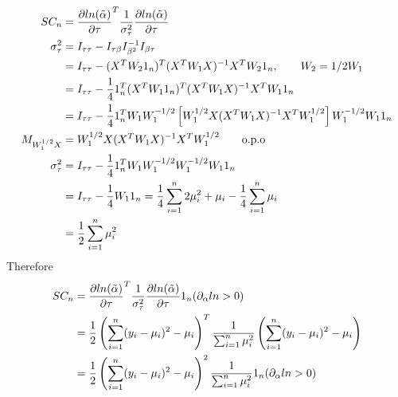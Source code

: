 \documentclass[11pt]{article} %
\begin{document}
\begin{align*}
	SC_n &= \frac{\partial ln(\Tilde{\alpha})}{\partial \tau}^T \frac{1}{\sigma_{\tau}^2} \frac{\partial ln(\Tilde{\alpha})}{\partial \tau}\\
	\sigma_{\tau}^2 &= I_{\tau \tau} - I_{\tau \beta} I_{\beta^2}^{-1} I_{\beta \tau} \\
	&= I_{\tau\tau} - (X^T W_2 1_n)^T (X^T W_1 X)^{-1} X^T W_2 1_n , \qquad W_2 = 1/2 W_1\\
	&= I_{\tau\tau} - \frac{1}{4} 1_n^T (X^T W_1 1_n)^T (X^T W_1 X)^{-1} X^T W_1 1_n \\
	&=I_{\tau\tau} -\frac{1}{4}  1_n^T W_1 W_1^{-1/2} \left[ W_1^{1/2} X (X^T W_1 X)^{-1} X^T W_1^{1/2}\right] W_1^{-1/2} W_1 1_n \\
	M_{ W_1^{1/2} X} &= W_1^{1/2} X (X^T W_1 X)^{-1} X^T W_1^{1/2} \qquad \text{o.p.o}\\
	\sigma_{\tau}^2 &= I_{\tau\tau} -\frac{1}{4} 1_n^T W_1 W_1^{-1/2}  W_1^{-1/2} W_1 1_n \\
	&= I_{\tau\tau} -\frac{1}{4} W_1 1_n = \frac{1}{4} \sum_{i=1}^n 2 \mu_i^2 + \mu_i - \frac{1}{4} \sum_{i=1}^n \mu_i \\
	&= \frac{1}{2} \sum_{i=1}^n \mu_i^2
\end{align*}
Therefore
\begin{align*}
	SC_n &= \frac{\partial ln(\Tilde{\alpha})}{\partial \tau}^T \frac{1}{\sigma_{\tau}^2} \frac{\partial ln(\Tilde{\alpha})}{\partial \tau} 1_n(\partial_{\alpha} ln > 0)\\
	&= \frac{1}{2} \left(\sum_{i=1}^n (y_i-\mu_i)^2- \mu_i \right)^T \frac{1}{\sum_{i=1}^n \mu_i^2} \left(\sum_{i=1}^n (y_i-\mu_i)^2- \mu_i \right) \\
	&= \frac{1}{2} \left(\sum_{i=1}^n (y_i-\mu_i)^2- \mu_i \right)^2 \frac{1}{\sum_{i=1}^n \mu_i^2}1_n(\partial_{\alpha} ln > 0)
\end{align*}
\end{document}
